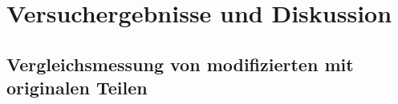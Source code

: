 \chapter{Versuchergebnisse und Diskussion}
\label{chap:ergebnisse_und_diskussion}

\section{Vergleichsmessung von modifizierten mit originalen Teilen}
\label{sec:vergleichsmessung}
